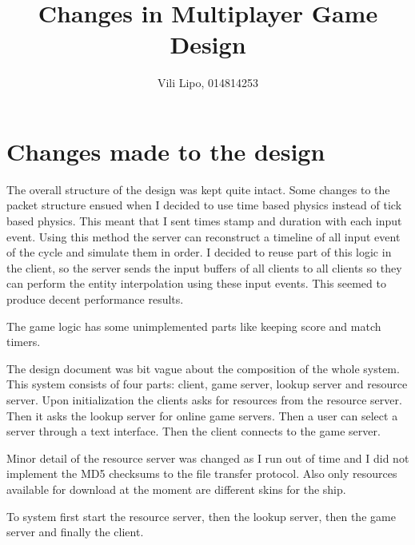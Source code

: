 \documentclass[10pt,a4paper]{article}
\author{Vili Lipo, 014814253}
\title{Changes in Multiplayer Game Design}
\begin{document}
 \maketitle
 \thispagestyle{plain}
 \section{Changes made to the design}

 The overall structure of the design was kept quite intact. Some
 changes to the packet structure ensued when I decided to use 
 time based physics instead of tick based physics. This meant
 that I sent times stamp and duration with each input event. 
 Using this method the server can reconstruct a timeline of
 all input event of the cycle and simulate them in order.
 I decided to reuse part of this logic in the client, so
 the server sends the input buffers of all clients to all clients
 so they can perform the entity interpolation using these input events.
 This seemed to produce decent performance results.

 The game logic has some unimplemented parts like keeping score and
 match timers.

 The design document was bit vague about the composition of the whole system.
 This system consists of four parts: client, game server, lookup server and resource server.
 Upon initialization the clients asks for resources from the resource server. Then it
 asks the lookup server for online game servers. Then a user can select a server through 
 a text interface. Then the client connects to the game server.

 Minor detail of the resource server was changed as I run out of time and
 I did not implement the MD5 checksums to the file transfer protocol. Also
 only resources available for download at the moment are different skins for the ship.

 To system first start the resource server, then the lookup server, then the game server
 and finally the client.
\end{document}
